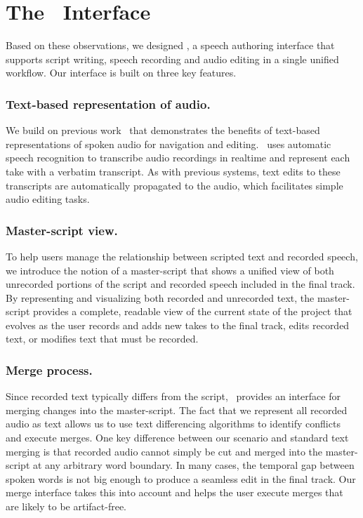 \section{The \voicescript\  Interface}
Based on these observations, we designed \voicescript , a speech authoring interface that supports script writing, speech recording and audio editing in a single unified workflow. Our interface is built on three key features.

\subsubsection{Text-based representation of audio.} 
We build on previous work~\cite{casares2002simplifying,whittaker2004semantic,berthouzoz2012tools,rubin2013content} that demonstrates the benefits of text-based representations of spoken audio for navigation and editing. \voicescript\ uses automatic speech recognition to transcribe audio recordings in realtime and represent each take with a verbatim transcript. As with previous systems, text edits to these transcripts are automatically propagated to the audio, which facilitates simple audio editing tasks. 

\subsubsection{Master-script view.} 
To help users manage the relationship between scripted text and recorded speech, we introduce the notion of a master-script that shows a unified view of both unrecorded portions of the script and recorded speech included in the final track. By representing and visualizing both recorded and unrecorded text, the master-script provides a complete, readable view of the current state of the project that evolves as the user records and adds new takes to the final track, edits recorded text, or modifies text that must be recorded. 

\subsubsection{Merge process.} 
Since recorded text typically differs from the script, \voicescript\ provides an interface for merging changes into the master-script. The fact that we represent all recorded audio as text allows us to use text differencing algorithms to identify conflicts and execute merges. One key difference between our scenario and standard text merging is that recorded audio cannot simply be cut and merged into the master-script at any arbitrary word boundary. In many cases, the temporal gap between spoken words is not big enough to produce a seamless edit in the final track. Our merge interface takes this into account and helps the user execute merges that are likely to be artifact-free.\\

